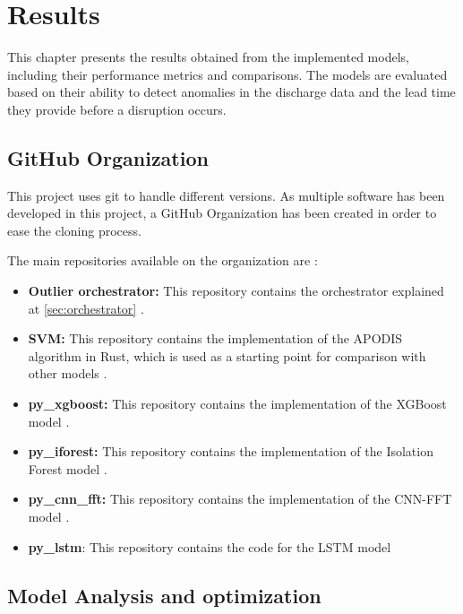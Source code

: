 \chapter{Results}\label{sec:cap4}

This chapter presents the results obtained from the implemented models, including their performance metrics and comparisons. The models are evaluated based on their ability to detect anomalies in the discharge data and the lead time they provide before a disruption occurs.

\section{GitHub Organization}

This project uses git to handle different versions. As multiple software has been developed in this project, a GitHub Organization has been created in order to ease the cloning process.

The main repositories available on the organization are \autocite{OutlierClassifier}:

\begin{itemize}
    \item \textbf{Outlier orchestrator:} This repository contains the orchestrator explained at \autoref{sec:orchestrator} \autocite{OutlierClassifierOutlier_orchestrator2025a}.
    \item \textbf{SVM:} This repository contains the implementation of the \ac{APODIS} algorithm in Rust, which is used as a starting point for comparison with other models \autocite{OutlierClassifierSvm2025}.
    \item \textbf{py\_xgboost:} This repository contains the implementation of the XGBoost model \autocite{OutlierClassifierPy_xgboost2025}.
    \item \textbf{py\_iforest:} This repository contains the implementation of the Isolation Forest model \autocite{OutlierClassifierPy_iforestPython}.
    \item \textbf{py\_cnn\_fft:} This repository contains the implementation of the CNN-FFT model \autocite{OutlierClassifierPy_cnn_fftCNN}.
    \item \textbf{py\_lstm}: This repository contains the code for the \ac{LSTM} model 
\end{itemize}

\section{Model Analysis and optimization}


